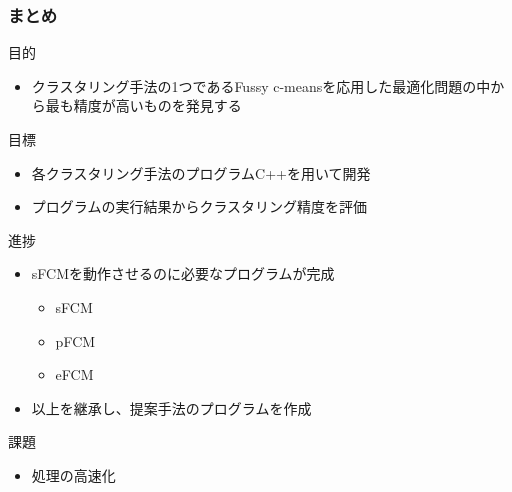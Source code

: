 \documentclass[13pt,dvipdfmx]{beamer}
\begin{document}
\begin{frame}\frametitle{まとめ}
  \begin{block}{目的}
    \begin{itemize}
    \item クラスタリング手法の1つであるFussy c-meansを応用した最適化問題の中から最も精度が高いものを発見する
    \end{itemize}
  \end{block}
  \begin{block}{目標}
    \begin{itemize}
    \item 各クラスタリング手法のプログラムC++を用いて開発
    \item プログラムの実行結果からクラスタリング精度を評価
    \end{itemize}
  \end{block}
  \begin{block}{進捗}
    \begin{itemize}
    \item sFCMを動作させるのに必要なプログラムが完成
      \begin{itemize}
      \item sFCM
      \item pFCM
      \item eFCM
      \end{itemize}
    \item 以上を継承し、提案手法のプログラムを作成
    \end{itemize}
  \end{block}
  \begin{block}{課題}
    \begin{itemize}
    \item 処理の高速化
    \end{itemize}
  \end{block}
\end{frame}
\end{document}
